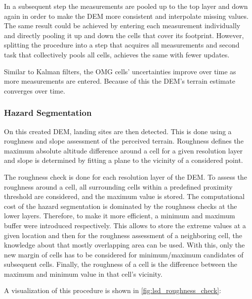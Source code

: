 In a subsequent step the measurements are pooled up to the top layer and down again in order to make the DEM more consistent and interpolate missing values. The same result could be achieved by entering each measurement individually and directly pooling it up and down the cells that cover its footprint. However, splitting the procedure into a step that acquires all measurements and second task that collectively pools all cells, achieves the same with fewer updates.

Similar to Kalman filters, the OMG cells' uncertainties improve over time as more measurements are entered. Because of this the DEM's terrain estimate converges over time. 

\subsubsection{Hazard Segmentation}\label{subsubsec:setup:haz_seg}

On this created DEM, landing sites are then detected. This is done using a roughness and slope assessment of the perceived terrain. Roughness defines the maximum absolute altitude difference around a cell for a given resolution layer and slope is determined by fitting a plane to the vicinity of a considered point.

The roughness check is done for each resolution layer of the DEM. To assess the roughness around a cell, all surrounding cells within a predefined proximity threshold are considered, and the maximum value is stored. The computational cost of the hazard segmentation is dominated by the roughness checks at the lower layers. Therefore, to make it more efficient, a minimum and maximum buffer were introduced respectively. This allows to store the extreme values at a given location and then for the roughness assessment of a neighboring cell, the knowledge about that mostly overlapping area can be used. With this, only the new margin of cells has to be considered for minimum/maximum candidates of subsequent cells. Finally, the roughness of a cell is the difference between the maximum and minimum value in that cell's vicinity.

A visualization of this procedure is shown in \cref{fig:lsd_roughness_check}:

